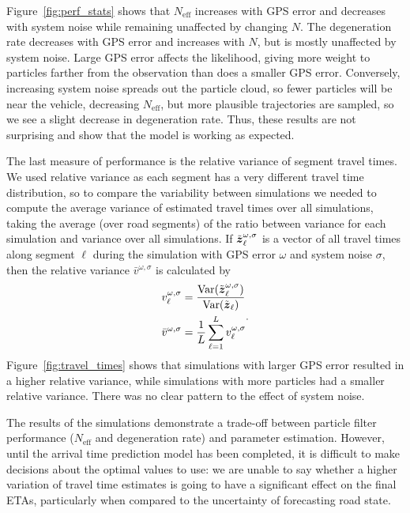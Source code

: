 Figure~\ref{fig:perf_stats} shows that $N_\text{eff}$ increases
with GPS error and decreases with system noise
while remaining unaffected by changing $N$.
The degeneration rate decreases with GPS error and increases with $N$,
but is mostly unaffected by system noise.
Large GPS error affects the likelihood,
giving more weight to particles farther from the observation
than does a smaller GPS error.
Conversely, increasing system noise spreads out the particle cloud,
so fewer particles will be near the vehicle,
decreasing $N_\text{eff}$,
but more plausible trajectories are sampled,
so we see a slight decrease in degeneration rate.
Thus, these results are not surprising
and show that the model is working as expected.


The last measure of performance is the relative variance of segment travel times.
We used relative variance as each segment has a very different travel time distribution,
so to compare the variability between simulations we needed to 
compute the average variance of estimated travel times over all simulations,
taking the average (over road segments) of the ratio between variance for
each simulation and variance over all simulations.
If $\tilde {\boldsymbol{z}}_\ell^{\omega,\sigma}$ is a vector of all travel times
along segment $\ell$ during the simulation with GPS error $\omega$ and system noise $\sigma$,
then the relative variance $\bar v^{\omega,\sigma}$ is calculated by
\begin{equation*}
\begin{split}
v_\ell^{\omega,\sigma} &=
\frac{\mathrm{Var}(\tilde {\boldsymbol{z}}_\ell^{\omega,\sigma})}{\mathrm{Var}(\tilde {\boldsymbol{z}}_\ell)} \\
\bar v^{\omega,\sigma} &=
    \frac{1}{L}\sum_{\ell=1}^L v_\ell^{\omega,\sigma}
\end{split}.
\end{equation*}
Figure~\ref{fig:travel_times} shows that simulations with larger GPS error
resulted in a higher relative variance,
while simulations with more particles had a smaller relative variance.
There was no clear pattern to the effect of system noise.


The results of the simulations
demonstrate a trade-off between particle filter performance
($N_\text{eff}$ and degeneration rate) and parameter estimation.
However, until the arrival time prediction model has been completed,
it is difficult to make decisions about the optimal values to use:
we are unable to say whether a higher variation of travel time estimates
is going to have a significant effect on the final ETAs,
particularly when compared to the uncertainty of forecasting road state.


